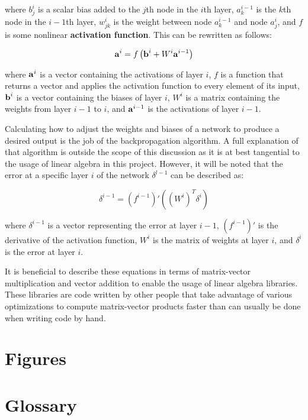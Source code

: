 \documentclass[12pt]{article}
\newcommand{\bi}[1]{\mbox{\textbf{#1}}}
\begin{document}
where $b_j^i$ is a scalar bias added to the $j$th node in the $i$th layer, $a_k^{i-1}$ is the $k$th node in the $i-1$th layer, $w_{jk}^i$ is the weight between node $a_k^{i-1}$ and node $a_j^i$, and $f$ is some nonlinear \textbf{activation function}.
This can be rewritten as follows:

\[
\bi{a}^i = f\left(\bi{b}^i + W^i\bi{a}^{i-1}\right)
\]

where $\bi{a}^i$ is a vector containing the activations of layer $i$, $f$ is a function that returns a vector and applies the activation function to every element of its input, $\bi{b}^i$ is a vector containing the biases of layer $i$, $W^i$ is a matrix containing the weights from layer $i - 1$ to $i$, and $\bi{a}^{i-1}$ is the activations of layer $i - 1$.

Calculating how to adjust the weights and biases of a network to produce a desired output is the job of the backpropagation algorithm.
A full explanation of that algorithm is outside the scope of this discussion as it is at best tangential to the usage of linear algebra in this project.
However, it will be noted that the error at a specific layer $i$ of the network $\delta^{l-1}$ can be described as:

\[
\delta^{i-1} = (f^{i-1})'\left(\left(W^i\right)^T\delta^i\right)
\]

where $\delta^{i-1}$ is a vector representing the error at layer $i - 1$, $(f^{i-1})'$ is the derivative of the activation function, $W^i$ is the matrix of weights at layer $i$, and $\delta^i$ is the error at layer $i$.

It is beneficial to describe these equations in terms of matrix-vector multiplication and vector addition to enable the usage of linear algebra libraries.
These libraries are code written by other people that take advantage of various optimizations to compute matrix-vector products faster than can usually be done when writing code by hand.

\section{Figures}


\section{Glossary}
\end{document}
